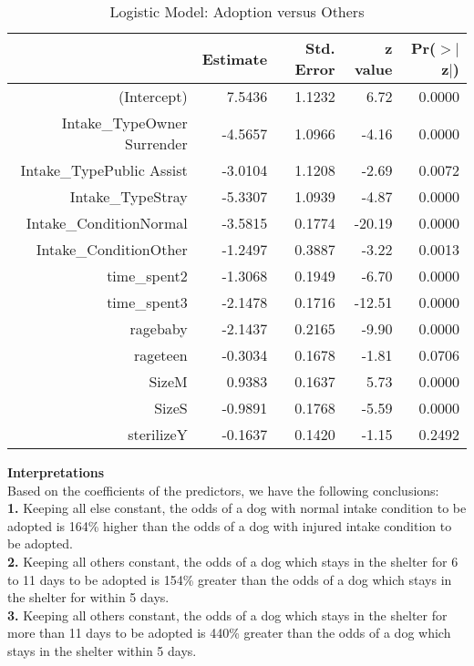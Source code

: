 \documentclass[12pt]{article}
\begin{document}
\begin{flushleft}
\begin{center}
\begin{table}[H]
\centering
\caption{Logistic Model: Adoption versus Others}
\begin{tabular}{rrrrr}
  \hline
 & Estimate & Std. Error & z value & Pr($>$$|$z$|$) \\ 
  \hline
(Intercept) & 7.5436 & 1.1232 & 6.72 & 0.0000 \\ 
  Intake\_TypeOwner Surrender & -4.5657 & 1.0966 & -4.16 & 0.0000 \\ 
  Intake\_TypePublic Assist & -3.0104 & 1.1208 & -2.69 & 0.0072 \\ 
  Intake\_TypeStray & -5.3307 & 1.0939 & -4.87 & 0.0000 \\ 
  Intake\_ConditionNormal & -3.5815 & 0.1774 & -20.19 & 0.0000 \\ 
  Intake\_ConditionOther & -1.2497 & 0.3887 & -3.22 & 0.0013 \\ 
  time\_spent2 & -1.3068 & 0.1949 & -6.70 & 0.0000 \\ 
  time\_spent3 & -2.1478 & 0.1716 & -12.51 & 0.0000 \\ 
  ragebaby & -2.1437 & 0.2165 & -9.90 & 0.0000 \\ 
  rageteen & -0.3034 & 0.1678 & -1.81 & 0.0706 \\ 
  SizeM & 0.9383 & 0.1637 & 5.73 & 0.0000 \\ 
  SizeS & -0.9891 & 0.1768 & -5.59 & 0.0000 \\ 
  sterilizeY & -0.1637 & 0.1420 & -1.15 & 0.2492 \\ 
   \hline
\end{tabular}
\end{table}
\end{center}
\textbf{Interpretations}\\
Based on the coefficients of the predictors, we have the following conclusions:\\
 
\textbf{1.} Keeping all else constant, the odds of a dog with normal intake condition to be adopted is 164\% higher than the odds of a dog with injured intake condition to be adopted.\\
 
\textbf{2.} Keeping all others constant, the odds of a dog which stays in the shelter for 6 to 11 days to be adopted is 154\% greater than the odds of a dog which stays in the shelter for within 5 days.\\
 
\textbf{3.} Keeping all others constant, the odds of a dog which stays in the shelter for more than 11 days to be adopted is 440\% greater than the odds of a dog which stays in the shelter within 5 days.\\
 

\end{flushleft}
\end{document}
